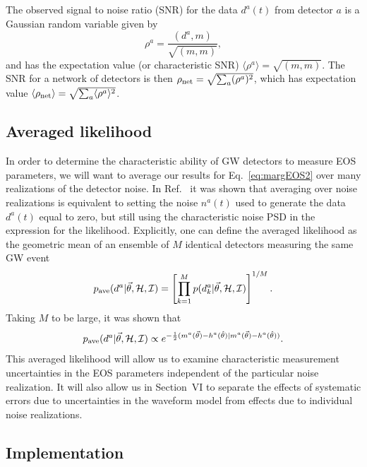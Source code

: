 \documentclass[twocolumn,prd,amssymb,aps,nofootinbib,showpacs,epsf]{revtex4}
\begin{document}
The observed signal to noise ratio (SNR) for the data $d^a(t)$ from detector $a$ is a Gaussian random variable given by
\begin{equation}
\rho^a = \frac{(d^a, m)}{\sqrt{(m, m)}},
\end{equation}
and has the expectation value (or characteristic SNR) $\langle \rho^a \rangle = \sqrt{(m, m)}$. The SNR for a network of detectors is then $\rho_{\rm net} = \sqrt{\sum_a(\rho^a)^2}$, which has expectation value $\langle \rho_{\rm net} \rangle = \sqrt{\sum_a\langle \rho^a \rangle^2}$.

\subsection{Averaged likelihood}
\label{sec:averagelike}

In order to determine the characteristic ability of GW detectors to measure EOS parameters, we will want to average our results for Eq.~\eqref{eq:margEOS2} over many realizations of the detector noise. In Ref.~\cite{NissankeHolzHughes2010} it was shown that averaging over noise realizations is equivalent to setting the noise $n^a(t)$ used to generate the data $d^a(t)$ equal to zero, but still using the characteristic noise PSD in the expression for the likelihood. Explicitly, one can define the averaged likelihood as the geometric mean of an ensemble of $M$ identical detectors measuring the same GW event
\begin{equation}
p_{\rm ave}(d^a | \vec\theta, \mathcal{H}, \mathcal{I}) = \left[\prod_{k=1}^M p(d_k^a | \vec\theta, \mathcal{H}, \mathcal{I})\right]^{1/M}.
\end{equation}
Taking $M$ to be large, it was shown that
\begin{equation}
\label{eq:averagedlike}
p_{\rm ave}(d^a | \vec\theta, \mathcal{H}, \mathcal{I}) \propto e^{-\frac{1}{2}(m^a(\vec\theta) - h^a(\hat\theta) | m^a(\vec\theta) - h^a(\hat\theta))}.
\end{equation}
This averaged likelihood will allow us to examine characteristic measurement uncertainties in the EOS parameters independent of the particular noise realization. It will also allow us in Section~VI to separate the effects of systematic errors due to uncertainties in the waveform model from effects due to individual noise realizations.

\subsection{Implementation}
\end{document}
